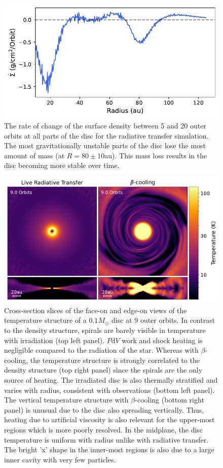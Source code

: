 \documentclass[usenatbib]{mnras}
\begin{document}
\begin{figure}
    \centering
    \includegraphics[width=\linewidth]{Images/sigmadot.pdf}
    \caption{The rate of change of the surface density between 5 and 20 outer orbits at all parts of the disc for the radiative transfer simulation. The most gravitationally unstable parts of the disc lose the most amount of mass (at ${R = 80\pm10}$au). This mass loss results in the disc becoming more stable over time.}
    \label{fig:sigmadot}
\end{figure}

\begin{figure}
    \centering
    \includegraphics[width=\linewidth]{compare_Temperature_horizontal.pdf}
    \caption{Cross-section slices of the face-on and edge-on views of the temperature structure of a $0.1M_\odot$ disc at 9 outer orbits. In contrast to the density structure, spirals are barely visible in temperature with irradiation (top left panel). $P\mathrm{d}V$ work and shock heating is negligible compared to the radiation of the star. Whereas with $\beta$-cooling, the temperature structure is strongly correlated to the density structure (top right panel) since the spirals are the only source of heating.  The irradiated disc is also thermally stratified and varies with radius, consistent with observations (bottom left panel). The vertical temperature structure with $\beta$-cooling (bottom right panel) is unusual due to the disc also spreading vertically. Thus, heating due to artificial viscosity is also relevant for the upper-most regions which is more poorly resolved. In the midplane, the disc temperature is uniform with radius unlike with radiative transfer. The bright 'x' shape in the inner-most regions is also due to a large inner cavity with very few particles.}
    \label{fig:temperature}
\end{figure}
\end{document}
